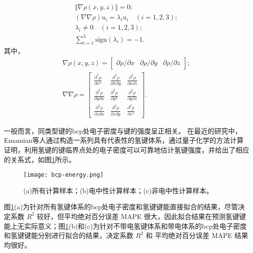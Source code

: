 \begin{gather}
    \Vert \nabla\rho(x,y,z)  \Vert = 0; \\
    (\nabla\nabla\rho)u_i = \lambda_i u_i\quad (i=1,2,3); \\
    \lambda_i \neq 0 \quad (i=1,2,3); \\
    \sum_{i=1}^3\text{sign}(\lambda_i) = -1.  
\end{gather}
其中，
\begin{gather}
    \nabla\rho(x,y,z) = 
    \begin{bmatrix}
        \partial\rho/\partial x & \partial\rho/\partial y & \partial\rho/\partial z
    \end{bmatrix}; \\
    \nabla\nabla\rho= 
    \begin{bmatrix}
        \displaystyle\frac{\partial^2 \rho}{\partial x^2} & \displaystyle\frac{\partial^2 \rho}{\partial x\partial y} & \displaystyle\frac{\partial^2 \rho}{\partial x \partial z} \\
        \displaystyle\frac{\partial^2 \rho }{\partial y \partial x} & \displaystyle\frac{\partial^2 \rho }{\partial y^2} & \displaystyle\frac{\partial^2 \rho }{\partial y \partial z} \\
        \displaystyle\frac{\partial^2 \rho }{\partial z \partial x} & \displaystyle\frac{\partial^2 \rho }{\partial z \partial y} & \displaystyle\frac{\partial^2 \rho }{\partial z^2}
    \end{bmatrix}.
\end{gather}

一般而言，同类型键的bcp处电子密度与键的强度呈正相关。
在最近的研究中，Emamian等人通过构造一系列具有代表性的氢键体系，通过量子化学的方法计算证明，利用氢键的键临界点处的电子密度可以可靠地估计氢键强度，并给出了相应的关系式，如图\ref{fig:bcp-energy}所示。

\begin{figure}[htbp]
    \centering
    \texttt{[image: bcp-energy.png]}
    \caption{(a)所有计算样本；(b)电中性计算样本；(c)非电中性计算样本。}
    \label{fig:bcp-energy}
\end{figure}

图\ref{fig:bcp-energy}(a)为针对所有氢键体系的bcp处电子密度和氢键键能直接拟合的结果，尽管决定系数 $R^2$ 较好，但平均绝对百分误差 MAPE 很大，因此拟合结果在预测氢键键能上无实际意义；图\ref{fig:bcp-energy}(b)和(c)为针对不带电氢键体系和带电体系的bcp处电子密度和氢键键能分别进行拟合的结果，决定系数 $R^2$ 和 平均绝对百分误差 MAPE 结果均很好。

